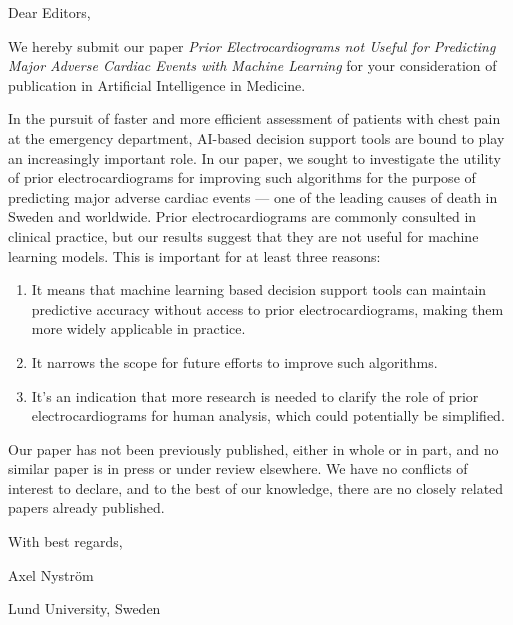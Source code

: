 \documentclass[a4paper,10pt]{letter}
\begin{document}
\pagestyle{empty}
Dear Editors,

We hereby submit our paper \textit{Prior Electrocardiograms not Useful for Predicting Major Adverse Cardiac Events with Machine Learning} for your consideration of publication in Artificial Intelligence in Medicine.

In the pursuit of faster and more efficient assessment of patients with chest pain at the emergency department, AI-based decision support tools are bound to play an increasingly important role. In our paper, we sought to investigate the utility of prior electrocardiograms for improving such algorithms for the purpose of predicting major adverse cardiac events --- one of the leading causes of death in Sweden and worldwide. Prior electrocardiograms are commonly consulted in clinical practice, but our results suggest that they are not useful for machine learning models. This is important for at least three reasons:

\begin{enumerate}
  \item It means that machine learning based decision support tools can maintain predictive accuracy without access to prior electrocardiograms, making them more widely applicable in practice.
  \item It narrows the scope for future efforts to improve such algorithms.
  \item It's an indication that more research is needed to clarify the role of prior electrocardiograms for human analysis, which could potentially be simplified.
\end{enumerate}

Our paper has not been previously published, either in whole or in part, and no similar paper is in press or under review elsewhere. We have no conflicts of interest to declare, and to the best of our knowledge, there are no closely related papers already published.

With best regards,

Axel Nyström

Lund University, Sweden
\end{document}
